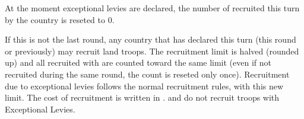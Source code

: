 \aparag At the moment exceptional levies are declared, the number of \LD
recruited this turn by the country is reseted to 0.

\bparag If this is not the last round, any country that has declared
 this turn (this round or previously) may recruit
land troops.
\bparag The recruitment limit is halved (rounded up) and all \LD recruited
with  are counted toward the same limit (even if not
recruited during the same round, the count is reseted only once).
\bparag Recruitment due to exceptional levies follows the normal recruitment
rules, with this new limit.
\bparag The cost of recruitment is written in .
\bparag \SUE and \PRU do not recruit  troops with Exceptional
Levies.

